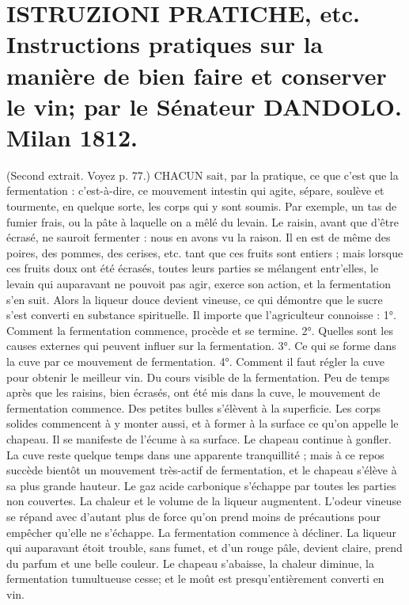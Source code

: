 \setcounter{page}{137} \section{ISTRUZIONI PRATICHE, etc. Instructions pratiques sur la manière de bien faire et conserver le vin; par le Sénateur DANDOLO. Milan 1812.}
(Second extrait. Voyez p. 77.)
CHACUN sait, par la pratique, ce que c'est que la fermentation : c'est-à-dire, ce mouvement intestin qui agite, sépare, soulève et tourmente, en quelque sorte, les corps qui y sont soumis. Par exemple, un tas de fumier frais, ou la pâte à laquelle on a mêlé du levain.
Le raisin, avant que d'être écrasé, ne sauroit fermenter : nous en avons vu la raison. Il en est de même des poires, des pommes, des cerises, etc. tant que ces fruits sont entiers ; mais lorsque ces fruits doux ont été écrasés, toutes leurs parties se mélangent entr'elles, le levain qui auparavant ne pouvoit pas agir, exerce son action, et la fermentation s'en suit. Alors la liqueur douce\setcounter{page}{138} devient vineuse, ce qui démontre que le sucre s'est converti en substance spirituelle.
Il importe que l'agriculteur connoisse :
1°. Comment la fermentation commence, procède et se termine.
2°. Quelles sont les causes externes qui peuvent influer sur la fermentation.
3°. Ce qui se forme dans la cuve par ce mouvement de fermentation.
4°. Comment il faut régler la cuve pour obtenir le meilleur vin.
Du cours visible de la fermentation.
Peu de temps après que les raisins, bien écrasés, ont été mis dans la cuve, le mouvement de fermentation commence.
Des petites bulles s'élèvent à la superficie.
Les corps solides commencent à y monter aussi, et à former à la surface ce qu'on appelle le chapeau.
Il se manifeste de l'écume à sa surface.
Le chapeau continue à gonfler.
La cuve reste quelque temps dans une apparente tranquillité ; mais à ce repos succède bientôt un mouvement très-actif de fermentation, et le chapeau s'élève à sa plus grande hauteur.
Le gaz acide carbonique s'échappe par toutes les parties non couvertes. La chaleur\setcounter{page}{139} et le volume de la liqueur augmentent. L'odeur vineuse se répand avec d'autant plus de force qu'on prend moins de précautions pour empêcher qu'elle ne s'échappe. La fermentation commence à décliner. La liqueur qui auparavant étoit trouble, sans fumet, et d'un rouge pâle, devient claire, prend du parfum et une belle couleur. Le chapeau s'abaisse, la chaleur diminue, la fermentation tumultueuse cesse; et le moût est presqu'entièrement converti en vin.
